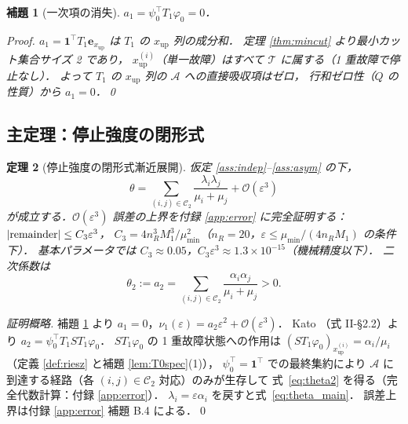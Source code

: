 \documentclass[12pt,a4paper]{article}
\theoremstyle{plain}
\newtheorem{theorem}{定理}[section]
\newtheorem{lemma}[theorem]{補題}
\theoremstyle{definition}
\theoremstyle{remark}
\newcommand{\calO}{\mathcal{O}}
\newcommand{\calA}{\mathcal{A}}
\newcommand{\calT}{\mathcal{T}}
\newcommand{\eps}{\varepsilon}
\newcommand{\RedRes}{S}
\newcommand{\calCtwo}{\mathcal{C}_2}
\begin{document}
\begin{lemma}[一次項の消失]\label{lem:a1zero}
  $a_1 = \psi_0^\top T_1\varphi_0 = 0$．

  \begin{proof}
    $a_1 = \mathbf{1}^\top T_1\mathbf{e}_{x_{\mathrm{up}}}$
    は $T_1$ の $x_{\mathrm{up}}$ 列の成分和．
    定理 \ref{thm:mincut} より最小カット集合サイズ 2 であり，
    $x_{\mathrm{up}}^{(i)}$（単一故障）はすべて $\calT$ に属する（1 重故障で停止なし）．
    よって $T_1$ の $x_{\mathrm{up}}$ 列の $\calA$ への直接吸収項はゼロ，
    行和ゼロ性（$Q$ の性質）から $a_1=0$．\qed
  \end{proof}
\end{lemma}

\subsection{主定理：停止強度の閉形式}

\begin{theorem}[停止強度の閉形式漸近展開]\label{thm:theta_main}
  仮定 \ref{ass:indep}--\ref{ass:asym} の下，
  \begin{equation}\label{eq:theta_main}
    \boxed{
    \theta = \sum_{(i,j)\in\calCtwo}\frac{\lambda_i\lambda_j}{\mu_i+\mu_j}
    + \calO(\eps^3)
    }
  \end{equation}
  が成立する．$\calO(\eps^3)$ 誤差の上界を付録 \ref{app:error} に完全証明する：
  $|{\rm remainder}|\le C_3\eps^3$，
  $C_3 = 4n_R^3 M_1^3/\mu_{\min}^2$（$n_R=20$，$\eps\le\mu_{\min}/(4n_R M_1)$ の条件下）．
  基本パラメータでは $C_3\approx0.05$，$C_3\eps^3\approx1.3\times10^{-15}$（機械精度以下）．
  二次係数は
  \begin{equation}\label{eq:theta2}
    \theta_2 := a_2 = \sum_{(i,j)\in\calCtwo}\frac{\alpha_i\alpha_j}{\mu_i+\mu_j} > 0.
  \end{equation}
\end{theorem}

\begin{proof}[証明概略]
  補題 \ref{lem:a1zero} より $a_1=0$，$\nu_1(\eps)=a_2\eps^2+\calO(\eps^3)$．
  Kato \cite{kato1995}（式 II-\S2.2）より $a_2=\psi_0^\top T_1\RedRes T_1\varphi_0$．
  $\RedRes T_1\varphi_0$ の 1 重故障状態への作用は
  $(\RedRes T_1\varphi_0)_{x_{\mathrm{up}}^{(i)}}=\alpha_i/\mu_i$
  （定義 \ref{def:riesz} と補題 \ref{lem:T0spec}(1)），
  $\psi_0^\top=\mathbf{1}^\top$ での最終集約により
  $\calA$ に到達する経路（各 $(i,j)\in\calCtwo$ 対応）のみが生存して
  式~\eqref{eq:theta2} を得る（完全代数計算：付録 \ref{app:error}）．
  $\lambda_i=\eps\alpha_i$ を戻すと式~\eqref{eq:theta_main}．
  誤差上界は付録 \ref{app:error} 補題 B.4 による．\qed
\end{proof}
\end{document}
